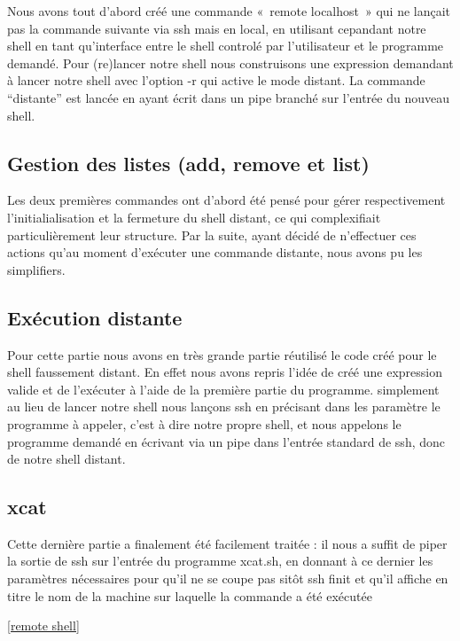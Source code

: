 \documentclass[12pt]{article}
\begin{document}
Nous avons tout d'abord créé une commande «~remote localhost~» qui ne lançait pas la commande
suivante via ssh mais en local, en utilisant cepandant notre shell en tant qu'interface entre le shell
controlé par l'utilisateur et le programme demandé. Pour (re)lancer notre shell nous construisons une
expression demandant à lancer notre shell avec l'option -r qui active le mode distant. La commande
“distante” est lancée en ayant écrit dans un pipe branché sur l'entrée du nouveau shell.

\subsection{Gestion des listes (add, remove et list)}

Les deux premières commandes ont d'abord été pensé pour gérer respectivement l'initialialisation
et la fermeture du shell distant, ce qui complexifiait particulièrement leur structure. Par la
suite, ayant décidé de n'effectuer ces actions qu'au moment d'exécuter une commande distante, nous
avons pu les simplifiers.

\subsection{Exécution distante}

Pour cette partie nous avons en très grande partie réutilisé le code créé pour le shell faussement
distant. En effet nous avons repris l'idée de créé une expression valide et de l'exécuter à l'aide
de la première partie du programme. simplement au lieu de lancer notre shell nous lançons ssh en
précisant dans les paramètre le programme à appeler, c'est à dire notre propre shell, et nous appelons
le programme demandé en écrivant via un pipe dans l'entrée standard de ssh, donc de notre shell distant.

\subsection{xcat}

Cette dernière partie a finalement été facilement traitée : il nous a suffit de piper la sortie de ssh
sur l'entrée du programme xcat.sh, en donnant à ce dernier les paramètres nécessaires pour qu'il ne se coupe pas
sitôt ssh finit et qu'il affiche en titre le nom de la machine sur laquelle la commande a été exécutée

\ref{remote shell}
\end{document}
